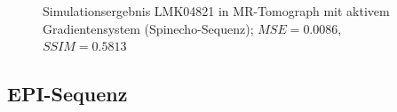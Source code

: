 \begin{figure}[H]
	\centering
	\hfill
	\caption[LMK04821 in MR-Tomograph mit aktivem Gradientensystem (SE) (3)]{Simulationsergebnis LMK04821 in MR-Tomograph mit aktivem Gradientensystem (Spinecho-Sequenz); $MSE=0.0086$, $SSIM=0.5813$}
	\label{fig:resLMKse3}	
\end{figure}

\subsection{EPI-Sequenz}

